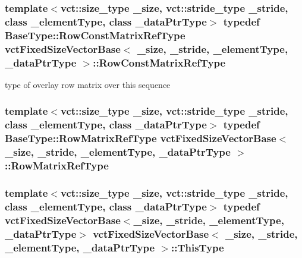 \hypertarget{classvct_fixed_size_vector_base_a8f1918b51b34a75973890b1b898b1991}{
\subsubsection[{Row\-Const\-Matrix\-Ref\-Type}]{\setlength{\rightskip}{0pt plus 5cm}template$<$vct\-::size\-\_\-type \-\_\-size, vct\-::stride\-\_\-type \-\_\-stride, class \-\_\-element\-Type, class \-\_\-data\-Ptr\-Type$>$ typedef {\bf Base\-Type\-::\-Row\-Const\-Matrix\-Ref\-Type} {\bf vct\-Fixed\-Size\-Vector\-Base}$<$ \-\_\-size, \-\_\-stride, \-\_\-element\-Type, \-\_\-data\-Ptr\-Type $>$\-::{\bf Row\-Const\-Matrix\-Ref\-Type}}}\label{classvct_fixed_size_vector_base_a8f1918b51b34a75973890b1b898b1991}
type of overlay row matrix over this sequence \hypertarget{classvct_fixed_size_vector_base_a880e7f696c2064b9e0339290e6a92c3f}{
\subsubsection[{Row\-Matrix\-Ref\-Type}]{\setlength{\rightskip}{0pt plus 5cm}template$<$vct\-::size\-\_\-type \-\_\-size, vct\-::stride\-\_\-type \-\_\-stride, class \-\_\-element\-Type, class \-\_\-data\-Ptr\-Type$>$ typedef {\bf Base\-Type\-::\-Row\-Matrix\-Ref\-Type} {\bf vct\-Fixed\-Size\-Vector\-Base}$<$ \-\_\-size, \-\_\-stride, \-\_\-element\-Type, \-\_\-data\-Ptr\-Type $>$\-::{\bf Row\-Matrix\-Ref\-Type}}}\label{classvct_fixed_size_vector_base_a880e7f696c2064b9e0339290e6a92c3f}
\hypertarget{classvct_fixed_size_vector_base_a44798eb609f1e32d7fa8f1ac63d3f894}{
\subsubsection[{This\-Type}]{\setlength{\rightskip}{0pt plus 5cm}template$<$vct\-::size\-\_\-type \-\_\-size, vct\-::stride\-\_\-type \-\_\-stride, class \-\_\-element\-Type, class \-\_\-data\-Ptr\-Type$>$ typedef {\bf vct\-Fixed\-Size\-Vector\-Base}$<$\-\_\-size, \-\_\-stride, \-\_\-element\-Type, \-\_\-data\-Ptr\-Type$>$ {\bf vct\-Fixed\-Size\-Vector\-Base}$<$ \-\_\-size, \-\_\-stride, \-\_\-element\-Type, \-\_\-data\-Ptr\-Type $>$\-::{\bf This\-Type}}}\label{classvct_fixed_size_vector_base_a44798eb609f1e32d7fa8f1ac63d3f894}
